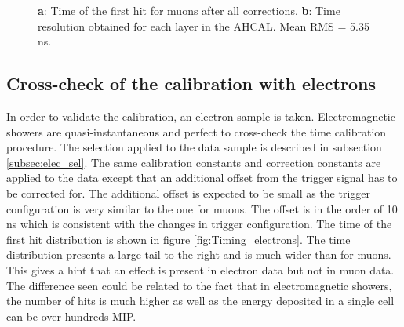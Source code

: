 \begin{figure}[htbp]
	\hfill
	\caption[]{\textbf{a}: Time of the first hit for muons after all corrections. \textbf{b}: Time resolution obtained for each layer in the AHCAL. Mean RMS = 5.35 ns.}
\end{figure}

\subsection{Cross-check of the calibration with electrons}
\label{subsec:validation}

In order to validate the calibration, an electron sample is taken. Electromagnetic showers are quasi-instantaneous and perfect to cross-check the time calibration procedure. The selection applied to the data sample is described in subsection \ref{subsec:elec_sel}. The same calibration constants and correction constants are applied to the data except that an additional offset from the trigger signal has to be corrected for. The additional offset is expected to be small as the trigger configuration is very similar to the one for muons. The offset is in the order of 10 ns which is consistent with the changes in trigger configuration. The time of the first hit distribution is shown in figure \ref{fig:Timing_electrons}. The time distribution presents a large tail to the right and is much wider than for muons. This gives a hint that an effect is present in electron data but not in muon data. The difference seen could be related to the fact that in electromagnetic showers, the number of hits is much higher as well as the energy deposited in a single cell can be over hundreds MIP.

